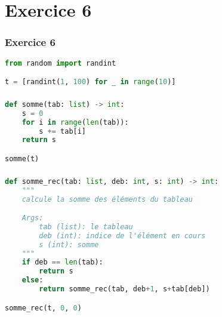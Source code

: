 \documentclass[svgnames,11pt]{beamer}
\begin{document}
\section{Exercice 6}
\begin{frame}[fragile]
    \frametitle{Exercice 6}

\begin{center}
\begin{lstlisting}[language=Python , basicstyle=\ttfamily\small, xleftmargin=2em, xrightmargin=2em]
from random import randint

t = [randint(1, 100) for _ in range(10)]
\end{lstlisting}
\end{center}

\end{frame}
\begin{frame}[fragile]
    \frametitle{}

\begin{center}
\begin{lstlisting}[language=Python , basicstyle=\ttfamily\small, xleftmargin=2em, xrightmargin=2em]
def somme(tab: list) -> int:
    s = 0
    for i in range(len(tab)):
        s += tab[i]
    return s

somme(t)
\end{lstlisting}
\end{center}

\end{frame}
\begin{frame}[fragile]
    \frametitle{}

\begin{center}
\begin{lstlisting}[language=Python , basicstyle=\ttfamily\small, xleftmargin=1em, xrightmargin=0.5em]
def somme_rec(tab: list, deb: int, s: int) -> int:
    """
    calcule la somme des éléments du tableau

    Args:
        tab (list): le tableau
        deb (int): indice de l'élément en cours
        s (int): somme
    """
    if deb == len(tab):
        return s
    else:
        return somme_rec(tab, deb+1, s+tab[deb])

somme_rec(t, 0, 0)

\end{lstlisting}
\label{CODE}
\end{center}

\end{frame}
\end{document}
